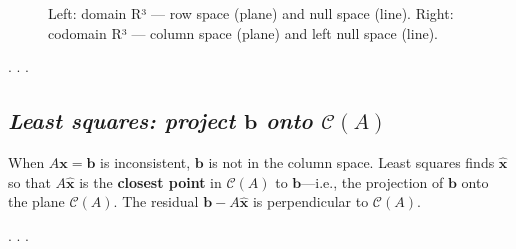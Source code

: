 \documentclass[
  letterpaper,
  DIV=11,
  numbers=noendperiod]{scrartcl}
\begin{document}
\begin{figure}


\caption{\label{fig-four-subspaces}Left: domain R³ --- row space (plane)
and null space (line). Right: codomain R³ --- column space (plane) and
left null space (line).}

\end{figure}%

. . .

\subsection{\texorpdfstring{\emph{Least squares: project \(\mathbf{b}\)
onto
\(\mathcal{C}(A)\)}}{Least squares: project \textbackslash mathbf\{b\} onto \textbackslash mathcal\{C\}(A)}}\label{least-squares-project-mathbfb-onto-mathcalca}

When \(A\mathbf{x}=\mathbf{b}\) is inconsistent, \(\mathbf{b}\) is not
in the column space. Least squares finds \(\widehat{\mathbf{x}}\) so
that \(A\widehat{\mathbf{x}}\) is the \textbf{closest point} in
\(\mathcal{C}(A)\) to \(\mathbf{b}\)---i.e., the projection of
\(\mathbf{b}\) onto the plane \(\mathcal{C}(A)\). The residual
\(\mathbf{b} - A\widehat{\mathbf{x}}\) is perpendicular to
\(\mathcal{C}(A)\).

. . .
\end{document}
